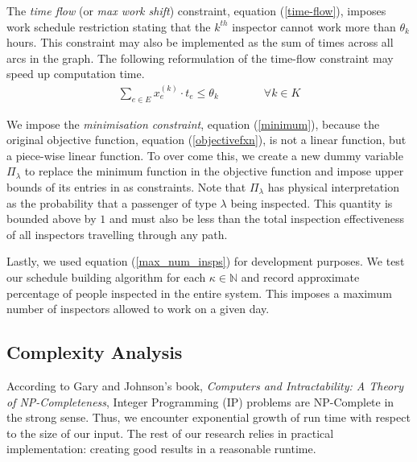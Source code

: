 \documentclass[11pt]{article}
\begin{document}
The \textit{time flow} (or \textit{max work shift}) constraint, equation (\ref{time-flow}), imposes work schedule restriction stating that the $k^{th}$ inspector cannot work more than $\theta_k$ hours. This constraint may also be implemented as the sum of times across all arcs in the graph. The following reformulation of the time-flow constraint may speed up computation time.
\begin{align}
    \sum_{e\in E}x_e^{(k)}\cdot t_e\le \theta_k\qquad\qquad\forall k\in K
\end{align}

We impose the \textit{minimisation constraint}, equation (\ref{minimum}), because the original objective function, equation (\ref{objectivefxn}), is not a linear function, but a piece-wise linear function. To over come this, we create a new dummy variable $\Pi_\lambda$ to replace the minimum function in the objective function and impose upper bounds of its entries in as constraints. Note that $\Pi_\lambda$ has physical interpretation as the probability that a passenger of type $\lambda$ being inspected. This quantity is bounded above by $1$ and must also be less than the total inspection effectiveness of all inspectors travelling through any path.

Lastly, we used equation (\ref{max_num_insps}) for development purposes. We test our schedule building algorithm for each $\kappa\in\mathbb{N}$ and record approximate percentage of people inspected in the entire system. This imposes a maximum number of inspectors allowed to work on a given day.

\subsection{Complexity Analysis}
According to Gary and Johnson's book, \textit{Computers and Intractability: A Theory of NP-Completeness}\cite{Garey:1990:CIG:574848}, Integer Programming (IP) problems are NP-Complete in the strong sense. Thus, we encounter exponential growth of run time with respect to the size of our input. The rest of our research relies in practical implementation: creating good results in a reasonable runtime.
\end{document}
